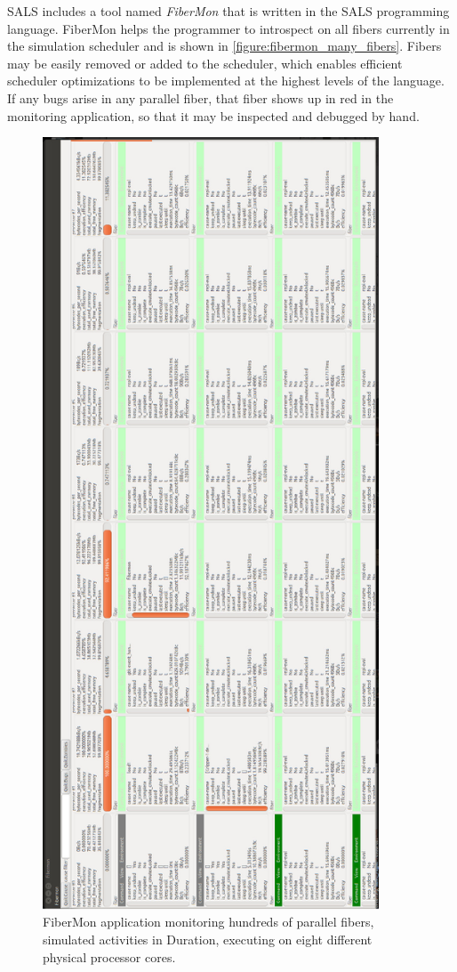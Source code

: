 SALS includes a tool named \emph{FiberMon} that is written in the SALS
programming language.  FiberMon helps the programmer to introspect on
all fibers currently in the simulation scheduler and is shown in
\autoref{figure:fibermon_many_fibers}.  Fibers may be easily removed
or added to the scheduler, which enables efficient scheduler
optimizations to be implemented at the highest levels of the language.
If any bugs arise in any parallel fiber, that fiber shows up in red in
the monitoring application, so that it may be inspected and debugged
by hand.
\begin{figure}[bth]
  \center
  \includegraphics[width=10cm]{gfx/fibermon_many_fibers}
  \caption[FiberMon application monitoring many fibers]{FiberMon
    application monitoring hundreds of parallel fibers, simulated
    activities in Duration, executing on eight different physical
    processor cores.}
  \label{figure:fibermon_many_fibers}
\end{figure}

